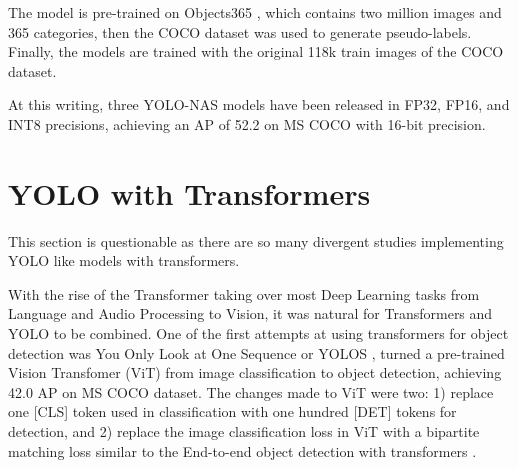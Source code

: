 \documentclass{article}
\begin{document}
The model is pre-trained on Objects365 \cite{shao2019objects365}, which contains two million images and 365 categories, then the COCO dataset was used to generate pseudo-labels. Finally, the models are trained with the original 118k train images of the COCO dataset.

At this writing, three YOLO-NAS models have been released in FP32, FP16, and INT8 precisions, achieving an AP of 52.2 on MS COCO with 16-bit precision.




\section{YOLO with Transformers}


This section is questionable as there are so many divergent studies implementing YOLO like models with transformers.

With the rise of the Transformer \cite{vaswani2017attention} taking over most Deep Learning tasks from Language and Audio Processing to Vision, it was natural for Transformers and YOLO to be combined. One of the first attempts at using transformers for object detection was You Only Look at One Sequence or YOLOS \cite{fang2021you}, turned a pre-trained Vision Transfomer (ViT) \cite{alexey2020image} from image classification to object detection, achieving 42.0 AP on MS COCO dataset. The changes made to ViT were two: 1) replace one [CLS] token used in classification with one hundred [DET] tokens for detection, and 2) replace the image classification loss in ViT with a bipartite matching loss similar to the End-to-end object detection with transformers \cite{carion2020end}.
\end{document}
